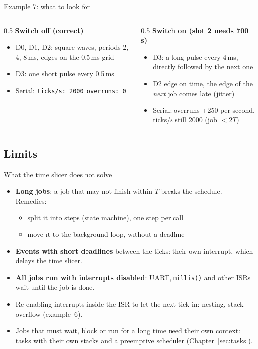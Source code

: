 \begin{frame}{Example 7: what to look for}
  \begin{columns}[T]
    \begin{column}{0.5\textwidth}
      \textbf{Switch off (correct)}
      \begin{itemize}
        \item D0, D1, D2: square waves, periods 2, 4, 8\,ms, edges on the 0.5\,ms grid
        \item D3: one short pulse every 0.5\,ms
        \item Serial: \texttt{ticks/s: 2000 overruns: 0}
      \end{itemize}
    \end{column}
    \begin{column}{0.5\textwidth}
      \textbf{Switch on (slot 2 needs 700\,\textmu s)}
      \begin{itemize}
        \item D3: a long pulse every 4\,ms, directly followed by the next one
        \item D2 edge on time, the edge of the \emph{next} job comes late (jitter)
        \item Serial: overruns +250 per second, ticks/s still 2000 (job $< 2T$)
      \end{itemize}
    \end{column}
  \end{columns}
\end{frame}

\subsection{Limits}
\begin{frame}{What the time slicer does not solve}
  \begin{itemize}
    \item \textbf{Long jobs}: a job that may not finish within $T$ breaks the schedule. Remedies:
      \begin{itemize}
        \item split it into steps (state machine), one step per call
        \item move it to the background loop, without a deadline
      \end{itemize}
    \item \textbf{Events with short deadlines} between the ticks: their own interrupt, which delays the time slicer.
    \item \textbf{All jobs run with interrupts disabled}: UART, \texttt{millis()} and other ISRs wait until the job is done.
    \item Re-enabling interrupts inside the ISR to let the next tick in: nesting, stack overflow (example~6).
    \item Jobs that must wait, block or run for a long time need their own context: \alert{tasks} with their own stacks and a preemptive scheduler (Chapter~\ref{sec:tasks}).
  \end{itemize}
\end{frame}

